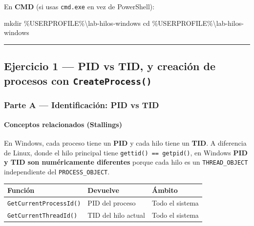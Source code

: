 \documentclass[
  spanish,
]{article}
\newenvironment{Shaded}{}{}
\newcommand{\BuiltInTok}[1]{\textcolor[rgb]{0.00,0.50,0.00}{#1}}
\newcommand{\NormalTok}[1]{#1}
\newcommand{\PreprocessorTok}[1]{\textcolor[rgb]{0.74,0.48,0.00}{#1}}
\newcommand{\VariableTok}[1]{\textcolor[rgb]{0.10,0.09,0.49}{#1}}
\newcounter{none} %
\begin{document}
En \textbf{CMD} (si usas \texttt{cmd.exe} en vez de PowerShell):

\begin{Shaded}
\begin{Highlighting}[]
\BuiltInTok{mkdir} \PreprocessorTok{\%}\VariableTok{USERPROFILE}\PreprocessorTok{\%}\NormalTok{\textbackslash{}lab{-}hilos{-}windows}
\BuiltInTok{cd} \PreprocessorTok{\%}\VariableTok{USERPROFILE}\PreprocessorTok{\%}\NormalTok{\textbackslash{}lab{-}hilos{-}windows}
\end{Highlighting}
\end{Shaded}

\begin{center}\rule{0.5\linewidth}{0.5pt}\end{center}

\subsection{\texorpdfstring{Ejercicio 1 --- PID vs TID, y creación de
procesos con
\texttt{CreateProcess()}}{Ejercicio 1 --- PID vs TID, y creación de procesos con CreateProcess()}}\label{ejercicio-1-pid-vs-tid-y-creaciuxf3n-de-procesos-con-createprocess}

\subsubsection{Parte A --- Identificación: PID vs
TID}\label{parte-a-identificaciuxf3n-pid-vs-tid}

\paragraph{Conceptos relacionados
(Stallings)}\label{conceptos-relacionados-stallings}

En Windows, cada proceso tiene un \textbf{PID} y cada hilo tiene un
\textbf{TID}. A diferencia de Linux, donde el hilo principal tiene
\texttt{gettid()\ ==\ getpid()}, en Windows \textbf{PID y TID son
numéricamente diferentes} porque cada hilo es un \texttt{THREAD\_OBJECT}
independiente del \texttt{PROCESS\_OBJECT}.

{\def\LTcaptype{none} %
\begin{longtable}[]{@{}lll@{}}
\toprule\noalign{}
Función & Devuelve & Ámbito \\
\midrule\noalign{}
\endhead
\bottomrule\noalign{}
\endlastfoot
\texttt{GetCurrentProcessId()} & PID del proceso & Todo el sistema \\
\texttt{GetCurrentThreadId()} & TID del hilo actual & Todo el sistema \\
\end{longtable}
}
\end{document}
